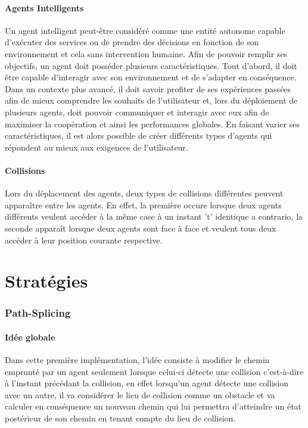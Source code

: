 \documentclass[a4paper, twocolumn]{article}
\begin{document}
		\subsection{Agents Intelligents}
		Un agent intelligent peut-être considéré comme une entité autonome capable d'exécuter des services ou de prendre des décisions en fonction de son environnement et cela sans intervention humaine. Afin de pouvoir remplir ses objectifs, un agent doit posséder plusieurs caractéristiques. Tout d'abord, il doit être capable d'interagir avec son environnement et de s'adapter en conséquence. Dans un contexte plus avancé, il doit savoir profiter de ses expériences passées afin de mieux comprendre les souhaits de l'utilisateur et, lors du déploiement de plusieurs agents, doit pouvoir communiquer et interagir avec eux afin de maximiser la coopération et ainsi les performances globales. En faisant varier ses caractéristiques, il est alors possible de créer différents types d'agents qui répondent au mieux aux exigences de l'utilisateur.
		
		\subsection{Collisions}
		Lors du déplacement des agents, deux types de collisions différentes peuvent apparaître entre les agents. En effet, la première occure lorsque deux agents différents veulent accéder à la même case à un instant 't' identique a contrario, la seconde apparaît lorsque deux agents sont face à face et veulent tous deux accéder à leur position courante respective.
		
	\setcounter{section}{0}
	\part{Stratégies}

		\section{Path-Splicing}

			\subsection{Idée globale}
			Dans cette première implémentation, l'idée consiste à modifier le chemin emprunté par un agent seulement lorsque celui-ci détecte une collision c'est-à-dire à l'instant précédant la collision, en effet lorsqu'un agent détecte une collision avec un autre, il va considérer le lieu de collision comme un obstacle et va calculer en conséquence un nouveau chemin qui lui permettra d'atteindre un état postérieur de son chemin en tenant compte du lieu de collision.
\end{document}

